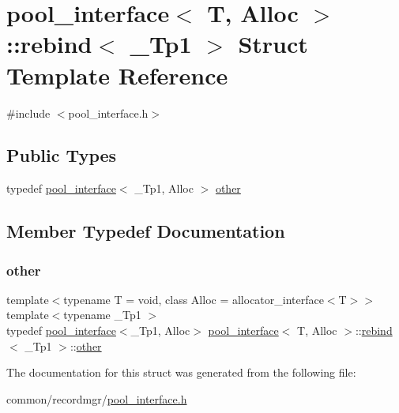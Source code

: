 \hypertarget{structpool__interface_1_1rebind}{}\section{pool\+\_\+interface$<$ T, Alloc $>$\+:\+:rebind$<$ \+\_\+\+Tp1 $>$ Struct Template Reference}
\label{structpool__interface_1_1rebind}


{\ttfamily \#include $<$pool\+\_\+interface.\+h$>$}

\subsection*{Public Types}
\begin{DoxyCompactItemize}
\item 
typedef \hyperlink{classpool__interface}{pool\+\_\+interface}$<$ \+\_\+\+Tp1, Alloc $>$ \hyperlink{structpool__interface_1_1rebind_af6f7917a1cabee04af383e31e2035148}{other}
\end{DoxyCompactItemize}


\subsection{Member Typedef Documentation}
\mbox{\label{structpool__interface_1_1rebind_af6f7917a1cabee04af383e31e2035148}} 
\subsubsection{\texorpdfstring{other}{other}}
{\footnotesize\ttfamily template$<$typename T  = void, class Alloc  = allocator\+\_\+interface$<$\+T$>$$>$ \\
template$<$typename \+\_\+\+Tp1 $>$ \\
typedef \hyperlink{classpool__interface}{pool\+\_\+interface}$<$\+\_\+\+Tp1, Alloc$>$ \hyperlink{classpool__interface}{pool\+\_\+interface}$<$ T, Alloc $>$\+::\hyperlink{structpool__interface_1_1rebind}{rebind}$<$ \+\_\+\+Tp1 $>$\+::\hyperlink{structpool__interface_1_1rebind_af6f7917a1cabee04af383e31e2035148}{other}}



The documentation for this struct was generated from the following file\+:\begin{DoxyCompactItemize}
\item 
common/recordmgr/\hyperlink{pool__interface_8h}{pool\+\_\+interface.\+h}\end{DoxyCompactItemize}
